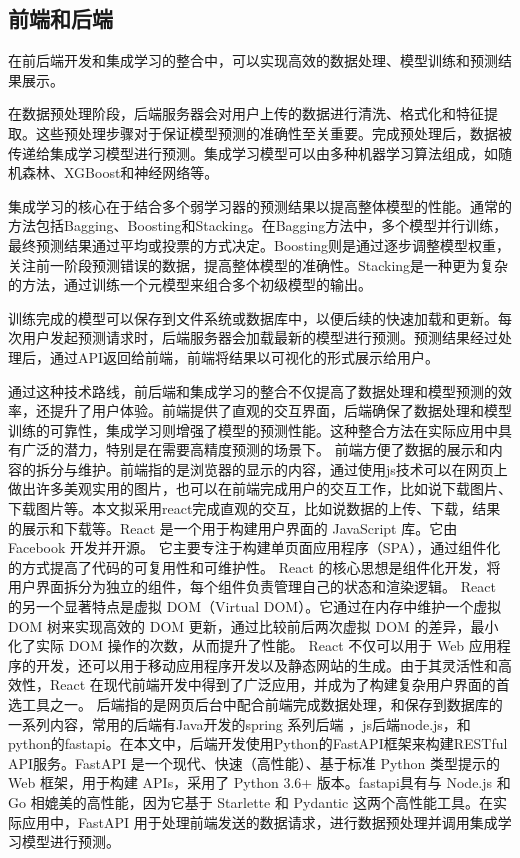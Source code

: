 \documentclass{article}
\begin{document}
	\subsection{前端和后端}
	在前后端开发和集成学习的整合中，可以实现高效的数据处理、模型训练和预测结果展示。
	
	在数据预处理阶段，后端服务器会对用户上传的数据进行清洗、格式化和特征提取。这些预处理步骤对于保证模型预测的准确性至关重要。完成预处理后，数据被传递给集成学习模型进行预测。集成学习模型可以由多种机器学习算法组成，如随机森林、XGBoost和神经网络等。
	
	集成学习的核心在于结合多个弱学习器的预测结果以提高整体模型的性能。通常的方法包括Bagging、Boosting和Stacking。在Bagging方法中，多个模型并行训练，最终预测结果通过平均或投票的方式决定。Boosting则是通过逐步调整模型权重，关注前一阶段预测错误的数据，提高整体模型的准确性。Stacking是一种更为复杂的方法，通过训练一个元模型来组合多个初级模型的输出。
	
	训练完成的模型可以保存到文件系统或数据库中，以便后续的快速加载和更新。每次用户发起预测请求时，后端服务器会加载最新的模型进行预测。预测结果经过处理后，通过API返回给前端，前端将结果以可视化的形式展示给用户。
	
	通过这种技术路线，前后端和集成学习的整合不仅提高了数据处理和模型预测的效率，还提升了用户体验。前端提供了直观的交互界面，后端确保了数据处理和模型训练的可靠性，集成学习则增强了模型的预测性能。这种整合方法在实际应用中具有广泛的潜力，特别是在需要高精度预测的场景下。
	前端方便了数据的展示和内容的拆分与维护。前端指的是浏览器的显示的内容，通过使用js技术可以在网页上做出许多美观实用的图片，也可以在前端完成用户的交互工作，比如说下载图片、下载图片等。本文拟采用react完成直观的交互，比如说数据的上传、下载，结果的展示和下载等。React 是一个用于构建用户界面的 JavaScript 库。它由 Facebook 开发并开源。
	它主要专注于构建单页面应用程序（SPA），通过组件化的方式提高了代码的可复用性和可维护性。 React 的核心思想是组件化开发，将用户界面拆分为独立的组件，每个组件负责管理自己的状态和渲染逻辑。 React 的另一个显著特点是虚拟 DOM（Virtual DOM）。它通过在内存中维护一个虚拟 DOM 树来实现高效的 DOM 更新，通过比较前后两次虚拟 DOM 的差异，最小化了实际 DOM 操作的次数，从而提升了性能。 React 不仅可以用于 Web 应用程序的开发，还可以用于移动应用程序开发以及静态网站的生成。由于其灵活性和高效性，React 在现代前端开发中得到了广泛应用，并成为了构建复杂用户界面的首选工具之一。
	后端指的是网页后台中配合前端完成数据处理，和保存到数据库的一系列内容，常用的后端有Java开发的spring 系列后端 ，js后端node.js，和python的fastapi。在本文中，后端开发使用Python的FastAPI框架来构建RESTful API服务。FastAPI 是一个现代、快速（高性能）、基于标准 Python 类型提示的 Web 框架，用于构建 APIs，采用了 Python 3.6+ 版本。fastapi具有与 Node.js 和 Go 相媲美的高性能，因为它基于 Starlette 和 Pydantic 这两个高性能工具。在实际应用中，FastAPI 用于处理前端发送的数据请求，进行数据预处理并调用集成学习模型进行预测。
	
\end{document}
